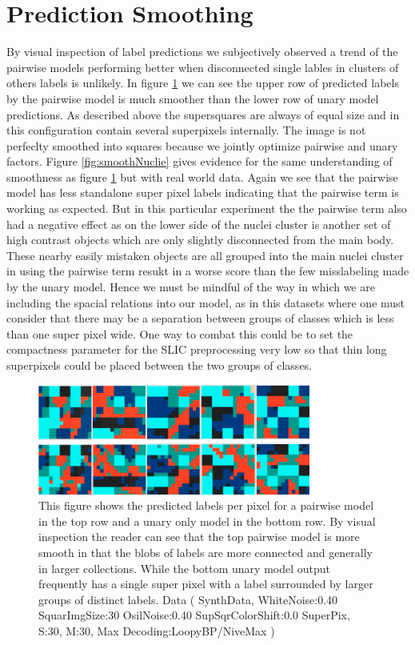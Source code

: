 \section{Prediction Smoothing}\label{smoothness}
By visual inspection of label predictions we subjectively observed a trend of the pairwise models performing better when disconnected single lables in clusters of others labels is unlikely. 
In figure \ref{fig:smooth1} we can see the upper row of predicted labels by the pairwise model is much smoother than the lower row of unary model predictions.  As described above the supersquares are always of equal size and in this configuration contain several superpixels internally. The image is not perfeclty smoothed into squares because we jointly optimize pairwise and unary factors. 
Figure \ref{fig:smoothNuclie} gives evidence for the same understanding of smoothness as figure \ref{fig:smooth1} but with real world data. Again we see that the pairwise model has less standalone super pixel labels indicating that the pairwise term is working as expected. But in this particular experiment the the pairwise term also had a negative effect as on the lower side of the nuclei cluster is another set of high contrast objects which are only slightly disconnected from the main body. These nearby easily mistaken objects are all grouped into the main nuclei cluster in using the pairwise term resukt in a worse score than the few misslabeling made by the unary model. Hence we must be mindful of the way in which we are including the spacial relations into our model, as in this datasets where one must consider that there may be a separation between groups of classes which is less than one super pixel wide. One way to combat this could be to set the compactness parameter for the SLIC preprocessing very low so that thin long superpixels could be placed between the two groups of classes. 
\begin{figure}[H]
  \centering
  
  \includegraphics[width=0.8\textwidth]{images/compare_smoothness_syntheticData_pariwise_v_unary.png}
  \caption{ This figure shows the predicted labels per pixel for a pairwise model in the top row and a unary only model in the bottom row. By visual inspection the reader can see that the top pairwise model is more smooth in that the blobs of labels are more connected and generally in larger collections. While the bottom unary model output frequently has a single super pixel with a label surrounded by larger groups of distinct labels. Data ( SynthData, WhiteNoise:0.40 SquarImgSize:30 OsilNoise:0.40 SupSqrColorShift:0.0 SuperPix, S:30, M:30, Max Decoding:LoopyBP/NiveMax )} 
  \label{fig:smooth1}
\end{figure} 

